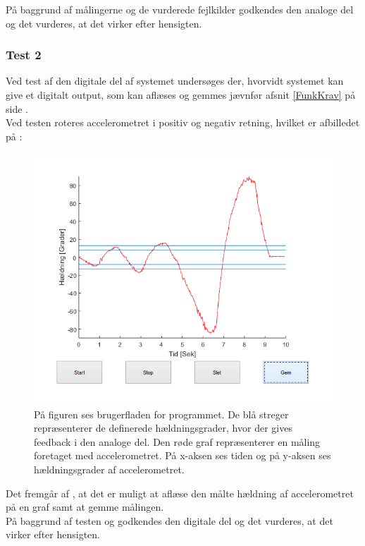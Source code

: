 På baggrund af målingerne og de vurderede fejlkilder godkendes den analoge del og det vurderes, at det virker efter hensigten.\\

\subsubsection{Test 2}
Ved test af den digitale del af systemet undersøges der, hvorvidt systemet kan give et digitalt output, som kan aflæses og gemmes jævnfør afsnit \ref{FunkKrav} på side \pageref{FunkKrav}. \\
Ved testen roteres accelerometret i positiv og negativ retning, hvilket er afbilledet på :
\begin{figure}[H]
	\centering
	\includegraphics[scale=.38]{figures/cProblemloesning/Software.jpg}
	\caption{På figuren ses brugerfladen for programmet. De blå streger repræsenterer de definerede hældningsgrader, hvor der gives feedback i den analoge del. Den røde graf repræsenterer en måling foretaget med accelerometret. På x-aksen ses tiden og på y-aksen ses hældningsgrader af accelerometret.}
	\label{fig:samlet_system_digital}
\end{figure}
\noindent Det fremgår af , at det er muligt at aflæse den målte hældning af accelerometret på en graf samt at gemme målingen.\\
På baggrund af testen og   godkendes den digitale del og det vurderes, at det virker efter hensigten.